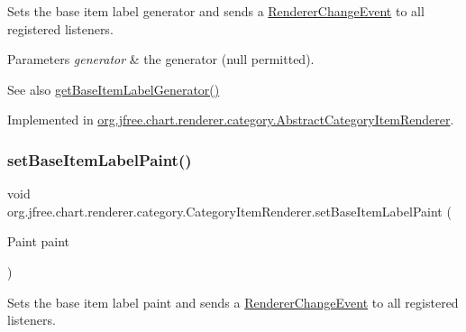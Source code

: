 Sets the base item label generator and sends a \mbox{\hyperlink{}{Renderer\+Change\+Event}} to all registered listeners.


\begin{DoxyParams}{Parameters}
{\em generator} & the generator ({\ttfamily null} permitted).\\
\hline
\end{DoxyParams}
\begin{DoxySeeAlso}{See also}
\mbox{\hyperlink{interfaceorg_1_1jfree_1_1chart_1_1renderer_1_1category_1_1_category_item_renderer_aa30e54bde9b1b02438519b9d11644ec4}{get\+Base\+Item\+Label\+Generator()}} 
\end{DoxySeeAlso}


Implemented in \mbox{\hyperlink{classorg_1_1jfree_1_1chart_1_1renderer_1_1category_1_1_abstract_category_item_renderer_a3752262b1c62f959e47ba3542e1e7149}{org.\+jfree.\+chart.\+renderer.\+category.\+Abstract\+Category\+Item\+Renderer}}.

\mbox{\label{interfaceorg_1_1jfree_1_1chart_1_1renderer_1_1category_1_1_category_item_renderer_a51d5ebfa3ec0fa1b1ed5ab9ac945c211}} 
\subsubsection{\texorpdfstring{set\+Base\+Item\+Label\+Paint()}{setBaseItemLabelPaint()}}
{\footnotesize\ttfamily void org.\+jfree.\+chart.\+renderer.\+category.\+Category\+Item\+Renderer.\+set\+Base\+Item\+Label\+Paint (\begin{DoxyParamCaption}\item[{Paint}]{paint }\end{DoxyParamCaption})}

Sets the base item label paint and sends a \mbox{\hyperlink{}{Renderer\+Change\+Event}} to all registered listeners.


